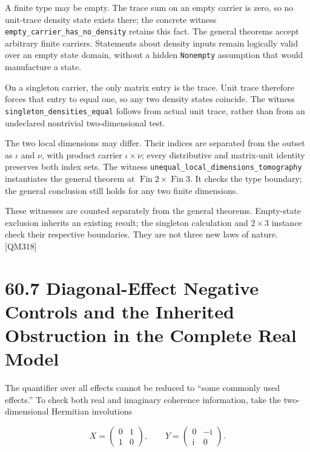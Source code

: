 \documentclass[
  11pt,
  oneside]{book}
\begin{document}
A finite type may be empty. The trace sum on an empty carrier is zero,
so no unit-trace density state exists there; the concrete witness
\texttt{empty\_\allowbreak carrier\_\allowbreak has\_\allowbreak no\_\allowbreak density} retains this fact. The general
theorems accept arbitrary finite carriers. Statements about density
inputs remain logically valid over an empty state domain, without a
hidden \texttt{Nonempty} assumption that would manufacture a state.

On a singleton carrier, the only matrix entry is the trace. Unit trace
therefore forces that entry to equal one, so any two density states
coincide. The witness \texttt{singleton\_\allowbreak densities\_\allowbreak equal} follows from
actual unit trace, rather than from an undeclared nontrivial
two-dimensional test.

The two local dimensions may differ. Their indices are separated from
the outset as \(\iota\) and \(\nu\), with product carrier
\(\iota\times\nu\); every distributive and matrix-unit identity
preserves both index sets. The witness
\texttt{unequal\_\allowbreak local\_\allowbreak dimensions\_\allowbreak tomography} instantiates the general
theorem at \(\operatorname{Fin}2\times\operatorname{Fin}3\). It checks
the type boundary; the general conclusion still holds for any two finite
dimensions.

These witnesses are counted separately from the general theorems.
Empty-state exclusion inherits an existing result; the singleton
calculation and \(2\times3\) instance check their respective boundaries.
They are not three new laws of nature. {[}QM318{]}

\section{60.7 Diagonal-Effect Negative Controls and the Inherited
Obstruction in the Complete Real Model}

The quantifier over all effects cannot be reduced to ``some commonly
used effects.'' To check both real and imaginary coherence information,
take the two-dimensional Hermitian involutions

\[
X=\begin{pmatrix}0&1\\1&0\end{pmatrix},\qquad
Y=\begin{pmatrix}0&-\mathrm i\\\mathrm i&0\end{pmatrix}.
\]
\end{document}
